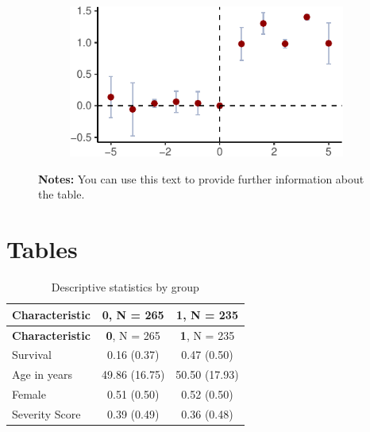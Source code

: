 \documentclass[12pt,a4paper,oneside]{article} %
\begin{document}
\begin{figure}

\caption{\label{fig-eventstudy}Coefficients relative to treatment time}

{\centering 

\begin{figure}[H]

{\centering \includegraphics{example_paper_files/figure-pdf/eventstudy-1.pdf}

}

\end{figure}

\hypertarget{fig-eventstudy-1}{}
\vspace{-10pt}
\begin{minipage}{0.9\textwidth}
\scriptsize
\singlespacing
\textbf{Notes:} You can use this text to provide further information about the table. \lipsum[66]
\end{minipage}
\vspace{15pt}

}

\end{figure}

\hypertarget{tables}{%
\section{Tables}\label{tables}}

\lipsum[1-2]
\clearpage

\hypertarget{tab-descriptives}{}
\begin{longtable}[]{@{}lcc@{}}
\caption{Descriptive statistics by group }\tabularnewline
\toprule\noalign{}
\textbf{Characteristic} & \textbf{0}, N = 265 & \textbf{1}, N = 235 \\
\midrule\noalign{}
\endfirsthead
\toprule\noalign{}
\textbf{Characteristic} & \textbf{0}, N = 265 & \textbf{1}, N = 235 \\
\midrule\noalign{}
\endhead
\bottomrule\noalign{}
\endlastfoot
Survival & 0.16 (0.37) & 0.47 (0.50) \\
Age in years & 49.86 (16.75) & 50.50 (17.93) \\
Female & 0.51 (0.50) & 0.52 (0.50) \\
Severity Score & 0.39 (0.49) & 0.36 (0.48) \\
\end{longtable}
\end{document}
